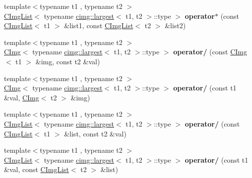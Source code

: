 \begin{DoxyCompactItemize}
\item 
\hypertarget{namespacecimg__library_a2d4c09d375ff240c021ebbe9e66e9ee6}{
{\footnotesize template$<$typename t1 , typename t2 $>$ }\\\hyperlink{structcimg__library_1_1_c_img_list}{CImgList}$<$ typename \hyperlink{structcimg__library_1_1cimg_1_1largest}{cimg::largest}$<$ t1, t2 $>$::type $>$ {\bfseries operator$\ast$} (const \hyperlink{structcimg__library_1_1_c_img_list}{CImgList}$<$ t1 $>$ \&list1, const \hyperlink{structcimg__library_1_1_c_img_list}{CImgList}$<$ t2 $>$ \&list2)}
\label{namespacecimg__library_a2d4c09d375ff240c021ebbe9e66e9ee6}

\item 
\hypertarget{namespacecimg__library_afab566aba0c97c91e490efcb3f40d796}{
{\footnotesize template$<$typename t1 , typename t2 $>$ }\\\hyperlink{structcimg__library_1_1_c_img}{CImg}$<$ typename \hyperlink{structcimg__library_1_1cimg_1_1largest}{cimg::largest}$<$ t1, t2 $>$::type $>$ {\bfseries operator/} (const \hyperlink{structcimg__library_1_1_c_img}{CImg}$<$ t1 $>$ \&img, const t2 \&val)}
\label{namespacecimg__library_afab566aba0c97c91e490efcb3f40d796}

\item 
\hypertarget{namespacecimg__library_abfa5a348accd82d1fe3e35ab81d7e636}{
{\footnotesize template$<$typename t1 , typename t2 $>$ }\\\hyperlink{structcimg__library_1_1_c_img}{CImg}$<$ typename \hyperlink{structcimg__library_1_1cimg_1_1largest}{cimg::largest}$<$ t1, t2 $>$::type $>$ {\bfseries operator/} (const t1 \&val, \hyperlink{structcimg__library_1_1_c_img}{CImg}$<$ t2 $>$ \&img)}
\label{namespacecimg__library_abfa5a348accd82d1fe3e35ab81d7e636}

\item 
\hypertarget{namespacecimg__library_a26ad2225cfbd62b780215771e7f4bb3b}{
{\footnotesize template$<$typename t1 , typename t2 $>$ }\\\hyperlink{structcimg__library_1_1_c_img_list}{CImgList}$<$ typename \hyperlink{structcimg__library_1_1cimg_1_1largest}{cimg::largest}$<$ t1, t2 $>$::type $>$ {\bfseries operator/} (const \hyperlink{structcimg__library_1_1_c_img_list}{CImgList}$<$ t1 $>$ \&list, const t2 \&val)}
\label{namespacecimg__library_a26ad2225cfbd62b780215771e7f4bb3b}

\item 
\hypertarget{namespacecimg__library_a09f8deffe288245b88e3d94046faba25}{
{\footnotesize template$<$typename t1 , typename t2 $>$ }\\\hyperlink{structcimg__library_1_1_c_img_list}{CImgList}$<$ typename \hyperlink{structcimg__library_1_1cimg_1_1largest}{cimg::largest}$<$ t1, t2 $>$::type $>$ {\bfseries operator/} (const t1 \&val, const \hyperlink{structcimg__library_1_1_c_img_list}{CImgList}$<$ t2 $>$ \&list)}
\label{namespacecimg__library_a09f8deffe288245b88e3d94046faba25}


\end{DoxyCompactItemize}
